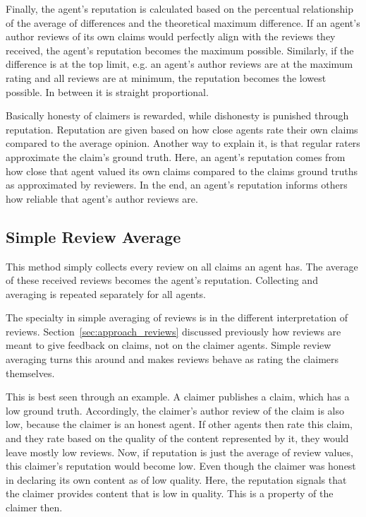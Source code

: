 \documentclass[%
    ]{\PathToTumTemplate/thesis/tum_thesis}
\begin{document}
Finally, the agent's reputation is calculated based on the percentual relationship of the average of differences and the theoretical maximum difference.
If an agent's author reviews of its own claims would perfectly align with the reviews they received, the agent's reputation becomes the maximum possible.
Similarly, if the difference is at the top limit, e.g. an agent's author reviews are at the maximum rating and all reviews are at minimum, the reputation becomes the lowest possible.
In between it is straight proportional.

Basically honesty of claimers is rewarded, while dishonesty is punished through reputation.
Reputation are given based on how close agents rate their own claims compared to the average opinion.
Another way to explain it, is that regular raters approximate the claim's ground truth.
Here, an agent's reputation comes from how close that agent valued its own claims compared to the claims ground truths as approximated by reviewers.
In the end, an agent's reputation informs others how reliable that agent's author reviews are.


\subsection{Simple Review Average}
This method simply collects every review on all claims an agent has.
The average of these received reviews becomes the agent's reputation.
Collecting and averaging is repeated separately for all agents.

The specialty in simple averaging of reviews is in the different interpretation of reviews.
Section~\ref{sec:approach_reviews} discussed previously how reviews are meant to give feedback on claims, not on the claimer agents.
Simple review averaging turns this around and makes reviews behave as rating the claimers themselves.

This is best seen through an example.
A claimer publishes a claim, which has a low ground truth.
Accordingly, the claimer's author review of the claim is also low, because the claimer is an honest agent.
If other agents then rate this claim, and they rate based on the quality of the content represented by it, they would leave mostly low reviews.
Now, if reputation is just the average of review values, this claimer's reputation would become low.
Even though the claimer was honest in declaring its own content as of low quality.
Here, the reputation signals that the claimer provides content that is low in quality.
This is a property of the claimer then.
\end{document}
